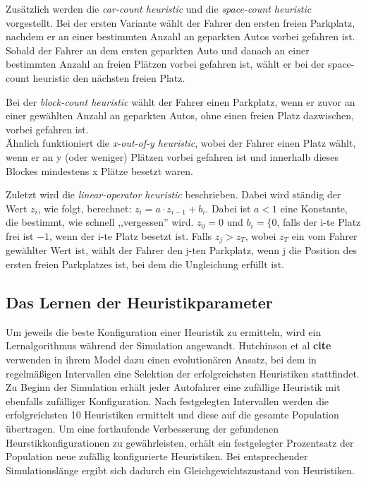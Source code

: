 Zusätzlich werden die \emph{car-count heuristic} und die \emph{space-count heuristic} vorgestellt. Bei der ersten Variante wählt der Fahrer den ersten freien Parkplatz, nachdem er an einer bestimmten Anzahl an geparkten Autos vorbei gefahren ist. Sobald der Fahrer an dem ersten geparkten Auto und danach an einer bestimmten Anzahl an freien Plätzen vorbei gefahren ist, wählt er bei der space-count heuristic den nächsten freien Platz.

Bei der \emph{block-count heuristic} wählt der Fahrer einen Parkplatz, wenn er zuvor an einer gewählten Anzahl an geparkten Autos, ohne einen freien Platz dazwischen, vorbei gefahren ist.\\
Ähnlich funktioniert die \emph{x-out-of-y heuristic}, wobei der Fahrer einen Platz wählt, wenn er an y (oder weniger) Plätzen vorbei gefahren ist und innerhalb dieses Blockes mindestens x Plätze besetzt waren. 

Zuletzt wird die \emph{linear-operator heuristic} beschrieben. Dabei wird ständig der Wert $z_i$, wie folgt, berechnet: $z_i=a\cdot z_{i-1}+b_i$. Dabei ist $a<1$ eine Konstante, die bestimmt, wie schnell ,,vergessen'' wird. $z_0=0$ und $b_i=\lbrace 0$, falls der i-te Platz frei ist $-1$, wenn der i-te Platz besetzt ist. %
Falls $z_j>z_T$, wobei $z_T$ ein vom Fahrer gewählter Wert ist, wählt der Fahrer den j-ten Parkplatz, wenn j die Position des ersten freien Parkplatzes ist, bei dem die Ungleichung erfüllt ist. 

\subsection{Das Lernen der Heuristikparameter}
Um jeweils die beste Konfiguration einer Heuristik zu ermitteln, wird ein Lernalgorithmus während der Simulation angewandt. Hutchinson et al \textbf{cite} verwenden in ihrem Model dazu einen evolutionären Ansatz, bei dem in regelmäßigen Intervallen eine Selektion der erfolgreichsten Heuristiken stattfindet. Zu Beginn der Simulation erhält jeder Autofahrer eine zufällige Heuristik mit ebenfalls zufälliger Konfiguration. Nach festgelegten Intervallen werden die erfolgreichsten 10 Heuristiken ermittelt und diese auf die gesamte Population übertragen. Um eine fortlaufende Verbesserung der gefundenen Heurstikkonfigurationen zu gewährleisten, erhält ein festgelegter Prozentsatz der Population neue zufällig konfigurierte Heuristiken. Bei entsprechender Simulationslänge ergibt sich dadurch ein Gleichgewichtszustand von Heuristiken. 

